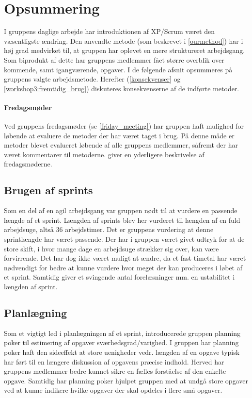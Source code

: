 \section{Opsummering}\label{workshop3:opsummering}
I gruppens daglige arbejde har introduktionen af XP/Scrum været den væsentligste ændring.
Den anvendte metode (som beskrevet i \cref{ourmethod}) har i høj grad medvirket til, at gruppen har oplevet en mere struktureret arbejdsgang.
Som biprodukt af dette har gruppens medlemmer fået større overblik over kommende, samt igangværende, opgaver.
I de følgende afsnit opsummeres på gruppens valgte arbejdsmetode.
Herefter (\cref{konsekvenser} og \cref{workshop3:fremtidig_brug}) diskuteres konsekvenserne af de indførte metoder.

\paragraph{Fredagsmøder}
Ved gruppens fredagsmøder (se \cref{friday_meeting}) har gruppen haft mulighed for løbende at evaluere de metoder der har været taget i brug.
På denne måde er metoder blevet evalueret løbende af alle gruppens medlemmer, såfremt der har været kommentarer til metoderne.
 giver en yderligere beskrivelse af fredagsmøderne.

\subsection{Brugen af sprints}
Som en del af en agil arbejdsgang var gruppen nødt til at vurdere en passende længde af et sprint.
Længden af sprints blev her vurderet til længden af en fuld arbejdsuge, altså 36 arbejdstimer.
Det er gruppens vurdering at denne sprintlængde har været passende.
Der har i gruppen været givet udtryk for at de store skift, i hvor mange dage en arbejdsuge strækker sig over, kan være forvirrende.
Det har dog ikke været muligt at ændre, da et fast timetal har været nødvendigt for bedre at kunne vurdere hvor meget der kan produceres i løbet af et sprint.
Samtidig giver et svingende antal forelæsninger mm. en ustabilitet i længden af sprint.

\subsection{Planlægning}
Som et vigtigt led i planlægningen af et sprint, introducerede gruppen planning poker til estimering af opgaver sværhedsgrad/varighed.
I gruppen har planning poker haft den sideeffekt at store uenigheder vedr. længden af en opgave typisk har ført til en længere diskussion af opgavens præcise indhold.
Herved har gruppens medlemmer bedre kunnet sikre en fælles forståelse af den enkelte opgave.
Samtidig har planning poker hjulpet gruppen med at undgå store opgaver ved at kunne indikere hvilke opgaver der skal opdeles i flere små opgaver.

